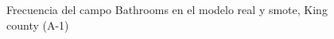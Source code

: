 \begin{figure}[H]
    \centering
    
    \caption{Frecuencia del campo Bathrooms en el modelo real y smote, King county (A-1)}
    \label{frecuency-smote-bathrooms}
\end{figure}
